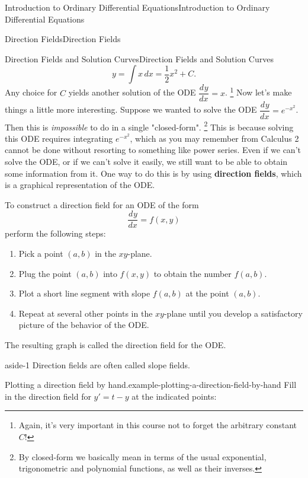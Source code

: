 \documentclass[10pt,]{book}
\newcommand{\terminology}[1]{\textbf{#1}}
\numberwithin{equation}{section}
\newcommand{\dv}[3][]{\dfrac{d^{#1} #2}{d #3^{#1}}}
\begin{document}
\begin{chapterptx}{Introduction to Ordinary Differential Equations}{}{Introduction to Ordinary Differential Equations}{}{}
\begin{sectionptx}{Direction Fields}{}{Direction Fields}{}{}
\begin{subsectionptx}{Direction Fields and Solution Curves}{}{Direction Fields and Solution Curves}{}{}
\begin{equation*}
y = \int x\,dx = \frac{1}{2}x^{2}+C.
\end{equation*}
Any choice for \(C\) yields another solution of the ODE \(\dv{y}{x} = x\).%
\footnote{Again, it's very important in this course not to forget the arbitrary constant \(C\)!\label{fn-1}}\hypertarget{p-38}{}%
Now let's make things a little more interesting. Suppose we wanted to solve the ODE \(\dv{y}{x} = e^{-x^{2}}\). Then this is \emph{impossible} to do in a single "closed-form". \footnote{By closed-form we basically mean in terms of the usual exponential, trigonometric and polynomial functions, as well as their inverses.\label{fn-2}} This is because solving this ODE requires integrating \(e^{-x^{2}}\), which as you may remember from Calculus 2 cannot be done without resorting to something like power series. Even if we can't solve the ODE, or if we can't solve it easily, we still want to be able to obtain some information from it. One way to do this is by using \terminology{direction fields}, which is a graphical representation of the ODE.%
\par
\hypertarget{p-39}{}%
To construct a direction field for an ODE of the form%
\begin{equation*}
\dv{y}{x} = f(x,y)
\end{equation*}
perform the following steps: \leavevmode%
\begin{enumerate}
\item\hypertarget{li-5}{}Pick a point \((a,b)\) in the \(xy\)-plane.%
\item\hypertarget{li-6}{}Plug the point \((a,b)\) into \(f(x,y)\) to obtain the number \(f(a,b)\).%
\item\hypertarget{li-7}{}Plot a short line segment with slope \(f(a,b)\) at the point \((a,b)\).%
\item\hypertarget{li-8}{}Repeat at several other points in the \(xy\)-plane until you develop a satisfactory picture of the behavior of the ODE.%
\end{enumerate}
 The resulting graph is called the direction field for the ODE.%
\begin{aside}{}{aside-1}%
\hypertarget{p-40}{}%
Direction fields are often called slope fields.%
\end{aside}
\begin{example}{Plotting a direction field by hand.}{example-plotting-a-direction-field-by-hand}%
\hypertarget{p-41}{}%
Fill in the direction field for \(y' = t - y\) at the indicated points:%
\begin{figure}

\end{figure}
\end{example}
\end{subsectionptx}
\end{sectionptx}
\end{chapterptx}
\end{document}
